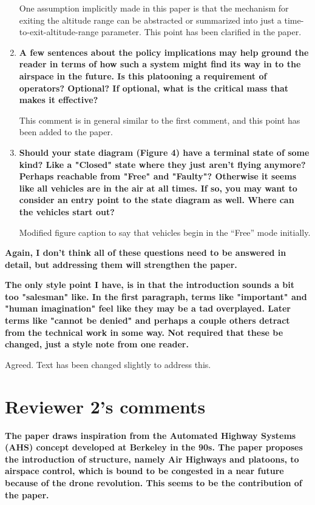 \documentclass[submit]{aiaa-pretty}
\begin{document}
\begin{enumerate}
One assumption implicitly made in this paper is that the mechanism for exiting the altitude range can be abstracted or summarized into just a time-to-exit-altitude-range parameter. This point has been clarified in the paper.

\item\textbf{A few sentences about the policy implications may help ground the reader in terms of how such a system might find its way in to the airspace in the future.  Is this platooning a requirement of operators?  Optional?  If optional, what is the critical mass that makes it effective?}

This comment is in general similar to the first comment, and this point has been added to the paper.

\item\textbf{Should your state diagram (Figure 4) have a terminal state of some kind?  Like a "Closed" state where they just aren't flying anymore?  Perhaps reachable from "Free" and "Faulty"?  Otherwise it seems like all vehicles are in the air at all times.  If so, you may want to consider an entry point to the state diagram as well.  Where can the vehicles start out?}

Modified figure caption to say that vehicles begin in the ``Free'' mode initially.
\end{enumerate}

\textbf{Again, I don't think all of these questions need to be answered in detail, but addressing them will strengthen the paper.}

\textbf{The only style point I have, is in that the introduction sounds a bit too "salesman" like.  In the first paragraph, terms like "important" and "human imagination" feel like they may be a tad overplayed.  Later terms like "cannot be denied" and perhaps a couple others detract from the technical work in some way.  Not required that these be changed, just a style note from one reader.}

Agreed. Text has been changed slightly to address this.

\section{Reviewer 2's comments}

\textbf{The paper draws inspiration from the Automated Highway Systems (AHS) concept developed at Berkeley in the 90s. The paper proposes the introduction of structure, namely Air Highways and platoons, to airspace control, which is bound to be congested in a near future because of the drone revolution. This seems to be the contribution of the paper.} 
\end{document}
